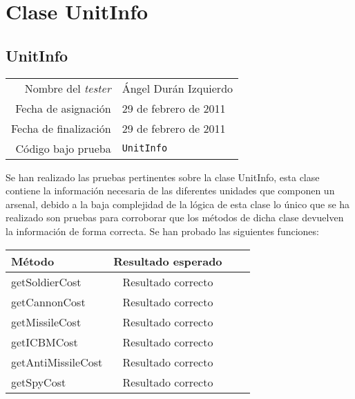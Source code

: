 \section{Clase UnitInfo}

\subsection{UnitInfo}

{\small
\begin{tabular}{r|l}
Nombre del \textit{tester} & \'Angel Dur\'an Izquierdo\\
Fecha de asignación & 29 de febrero de 2011 \\
Fecha de finalización & 29 de febrero de 2011 \\
Código bajo prueba & \texttt{UnitInfo}
\end{tabular}
}

Se han realizado las pruebas pertinentes sobre la clase UnitInfo, esta clase contiene la informaci\'on necesaria de las diferentes unidades que componen un arsenal, debido a la baja complejidad de la l\'ogica de esta clase lo \'unico que se ha realizado son pruebas para corroborar que los m\'etodos de dicha clase devuelven la informaci\'on de forma correcta. Se han probado las siguientes funciones:

{\footnotesize
\begin{longtable}[c]{lccc}
\textbf{M\'etodo} & \textbf{Resultado esperado} \\
\hline \hline
\endhead

getSoldierCost & Resultado correcto\\
getCannonCost  & Resultado correcto\\
getMissileCost & Resultado correcto\\
getICBMCost & Resultado correcto\\
getAntiMissileCost & Resultado correcto\\
getSpyCost & Resultado correcto\\

\hline
\end{longtable}
}  